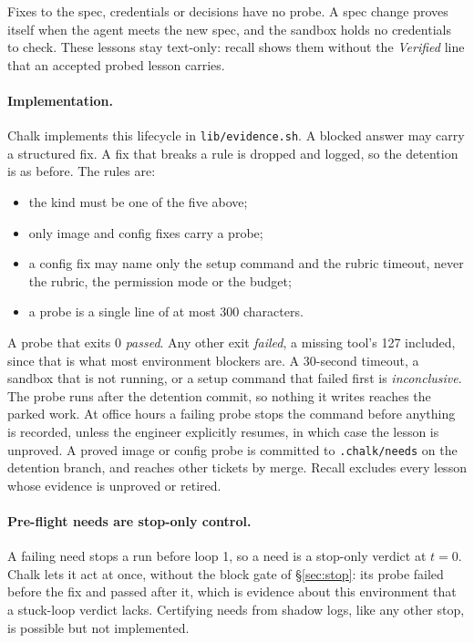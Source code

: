 \documentclass[11pt]{article}
\theoremstyle{remark}
\begin{document}
Fixes to the spec, credentials or decisions have no probe. A spec change proves itself when the agent meets the new spec, and the sandbox holds no credentials to check. These lessons stay text-only: recall shows them without the \emph{Verified} line that an accepted probed lesson carries.

\paragraph{Implementation.}
Chalk implements this lifecycle in \texttt{lib/evidence.sh}. A blocked answer may carry a structured fix. A fix that breaks a rule is dropped and logged, so the detention is as before. The rules are:
\begin{itemize}[leftmargin=*,nosep]
\item the kind must be one of the five above;
\item only image and config fixes carry a probe;
\item a config fix may name only the setup command and the rubric timeout, never the rubric, the permission mode or the budget;
\item a probe is a single line of at most 300 characters.
\end{itemize}
A probe that exits 0 \emph{passed}. Any other exit \emph{failed}, a missing tool's 127 included, since that is what most environment blockers are. A 30-second timeout, a sandbox that is not running, or a setup command that failed first is \emph{inconclusive}. The probe runs after the detention commit, so nothing it writes reaches the parked work. At office hours a failing probe stops the command before anything is recorded, unless the engineer explicitly resumes, in which case the lesson is unproved. A proved image or config probe is committed to \texttt{.chalk/needs} on the detention branch, and reaches other tickets by merge. Recall excludes every lesson whose evidence is unproved or retired.

\paragraph{Pre-flight needs are stop-only control.}
A failing need stops a run before loop 1, so a need is a stop-only verdict at $t=0$. Chalk lets it act at once, without the block gate of \S\ref{sec:stop}: its probe failed before the fix and passed after it, which is evidence about this environment that a stuck-loop verdict lacks. Certifying needs from shadow logs, like any other stop, is possible but not implemented.
\end{document}
